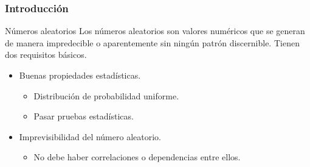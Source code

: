 \documentclass[10pt]{beamer}
\begin{document}
\begin{frame}
    \frametitle{Introducción}
    \begin{block}{Números aleatorios}
        \justifying
        Los números aleatorios son valores numéricos que se generan de manera impredecible o aparentemente sin ningún patrón discernible. Tienen dos requisitos básicos.
        \begin{itemize}
            \item Buenas propiedades estadísticas. 
            \begin{itemize}
                 \item Distribución de probabilidad uniforme.
                 \item Pasar pruebas estadísticas.
            \end{itemize}
            \item Imprevisibilidad del número aleatorio.
            \begin{itemize}
                \item No debe haber correlaciones o dependencias entre ellos.
            \end{itemize}
        \end{itemize}
	\end{block}
\end{frame}
\end{document}

